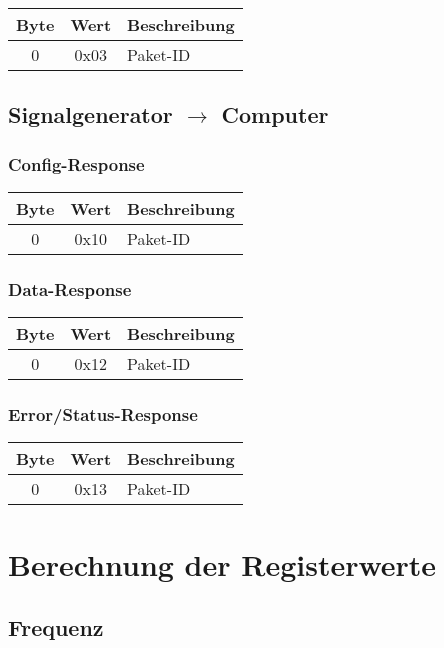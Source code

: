 \documentclass[a4paper,12pt]{article}
\begin{document}
\begin{tabular}{c||c|l}
Byte & Wert & Beschreibung \\
\hline
\hline
0 & 0x03 & Paket-ID \\

\end{tabular}

\subsection{Signalgenerator $\rightarrow$ Computer}

\subsubsection{Config-Response}

\begin{tabular}{c||c|l}
Byte & Wert & Beschreibung \\
\hline
\hline
0 & 0x10 & Paket-ID \\

\end{tabular}
\subsubsection{Data-Response}

\begin{tabular}{c||c|l}
Byte & Wert & Beschreibung \\
\hline
\hline
0 & 0x12 & Paket-ID \\

\end{tabular}
\subsubsection{Error/Status-Response}

\begin{tabular}{c||c|l}
Byte & Wert & Beschreibung \\
\hline
\hline
0 & 0x13 & Paket-ID \\

\end{tabular}

\section{Berechnung der Registerwerte}
\subsection{Frequenz}
\end{document}
